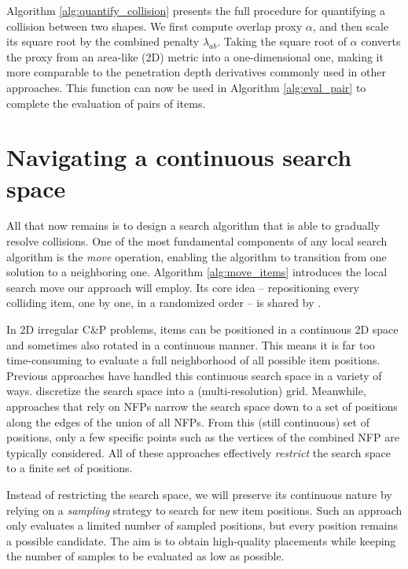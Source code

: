 \documentclass[preprint, 11pt, authoryear]{elsarticle}
\begin{document}
Algorithm \ref{alg:quantify_collision} presents the full procedure for quantifying a collision between two shapes.
We first compute overlap proxy $\alpha$, and then scale its square root by the combined penalty $\lambda_{ab}$.
Taking the square root of $\alpha$ converts the proxy from an area-like (2D) metric into a one-dimensional one, making it more comparable to the penetration depth derivatives commonly used in other approaches.
This function can now be used in Algorithm \ref{alg:eval_pair} to complete the evaluation of pairs of items.

\section{Navigating a continuous search space} \label{section:continuous_search_space}

All that now remains is to design a search algorithm that is able to gradually resolve collisions.
One of the most fundamental components of any local search algorithm is the \emph{move} operation, enabling the algorithm to transition from one solution to a neighboring one.
Algorithm \ref{alg:move_items} introduces the local search move our approach will employ.
Its core idea -- repositioning every colliding item, one by one, in a randomized order -- is shared by \citet{umetani2009solving,sato2019raster,elkeran2013new}.



In 2D irregular C\&P problems, items can be positioned in a continuous 2D space and sometimes also rotated in a continuous manner.
This means it is far too time-consuming to evaluate a full neighborhood of all possible item positions.
Previous approaches have handled this continuous search space in a variety of ways.
\citet{sato2019raster} discretize the search space into a (multi-resolution) grid.
Meanwhile, approaches that rely on NFPs \citep{umetani2009solving,elkeran2013new} narrow the search space down to a set of positions along the edges of the union of all NFPs.
From this (still continuous) set of positions, only a few specific points such as the vertices of the combined NFP are typically considered.
All of these approaches effectively \emph{restrict} the search space to a finite set of positions.

Instead of restricting the search space, we will preserve its continuous nature by relying on a \emph{sampling} strategy to search for new item positions.
Such an approach only evaluates a limited number of sampled positions, but every position remains a possible candidate.
The aim is to obtain high-quality placements while keeping the number of samples to be evaluated as low as possible.
\end{document}
